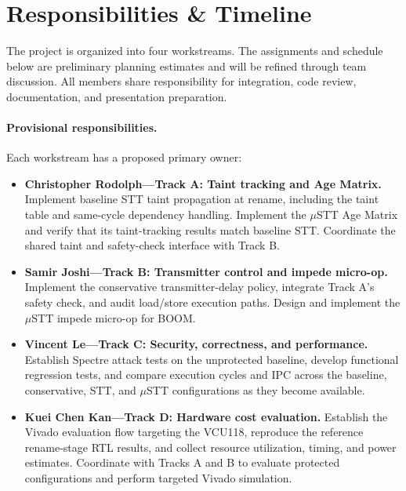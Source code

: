 \section{Responsibilities \& Timeline}
\label{sec:responsibilities}


The project is organized into four workstreams.
The assignments and schedule below are preliminary
planning estimates and will be refined through team
discussion. All members share responsibility for
integration, code review, documentation, and presentation
preparation.

\paragraph{Provisional responsibilities.}
Each workstream has a proposed primary owner:

\begin{itemize}
    \item \textbf{Christopher Rodolph---Track A:
    Taint tracking and Age Matrix.}
    Implement baseline STT taint propagation at rename,
    including the taint table and same-cycle dependency
    handling. Implement the $\mu$STT Age Matrix and verify
    that its taint-tracking results match baseline STT.
    Coordinate the shared taint and safety-check interface
    with Track B.

    \item \textbf{Samir Joshi---Track B:
    Transmitter control and impede micro-op.}
    Implement the conservative transmitter-delay policy,
    integrate Track A's safety check, and audit load/store
    execution paths. Design and implement the $\mu$STT
    impede micro-op for BOOM.

    \item \textbf{Vincent Le---Track C:
    Security, correctness, and performance.}
    Establish Spectre attack tests on the unprotected
    baseline, develop functional regression tests, and
    compare execution cycles and IPC across the baseline,
    conservative, STT, and $\mu$STT configurations as
    they become available.

    \item \textbf{Kuei Chen Kan---Track D:
    Hardware cost evaluation.}
    Establish the Vivado evaluation flow targeting the
    VCU118, reproduce the reference rename-stage RTL
    results, and collect resource utilization, timing,
    and power estimates. Coordinate with Tracks A and B
    to evaluate protected configurations and perform
    targeted Vivado simulation.
\end{itemize}

